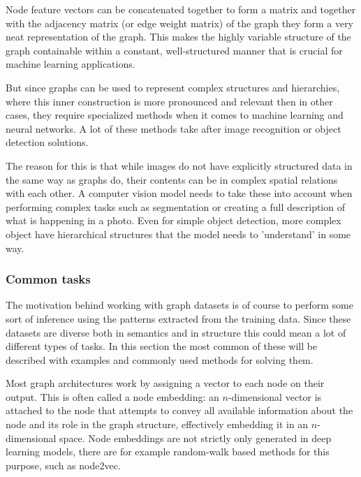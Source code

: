 	Node feature vectors can be concatenated together to form a matrix and together with the adjacency matrix (or edge weight matrix) of the graph they form a very neat representation of the graph. This makes the highly variable structure of the graph containable within a constant, well-structured manner that is crucial for machine learning applications.
	
	But since graphs can be used to represent complex structures and hierarchies, where this inner construction is more pronounced and relevant then in other cases, they require specialized methods when it comes to machine learning and neural networks. A lot of these methods take after image recognition or object detection solutions.
	
	The reason for this is that while images do not have explicitly structured data in the same way as graphs do, their contents can be in complex spatial relations with each other. A computer vision model needs to take these into account when performing complex tasks such as segmentation or creating a full description of what is happening in a photo. Even for simple object detection, more complex object have hierarchical structures that the model needs to 'understand' in some way.
	
		
	\subsubsection{Common tasks}
	\label{section:common_tasks}
	
	The motivation behind working with graph datasets is of course to perform some sort of inference using the patterns extracted from the training data. Since these datasets are diverse both in semantics and in structure this could mean a lot of different types of tasks. In this section the most common of these will be described with examples and commonly used methods for solving them.
	
	Most graph architectures work by assigning a vector to each node on their output. This is often called a node embedding: an $n$-dimensional vector is attached to the node that attempts to convey all available information about the node and its role in the graph structure, effectively embedding it in an $n$-dimensional space. Node embeddings are not strictly only generated in deep learning models, there are for example random-walk based methods for this purpose, such as node2vec. 
	
